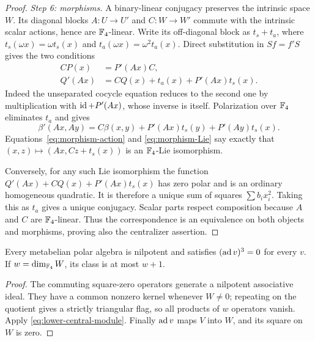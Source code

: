 \begin{proof}
\emph{Step 6: morphisms.}
A binary-linear conjugacy preserves the intrinsic space \(W\).
Its diagonal blocks \(A:U\to U'\) and \(C:W\to W'\) commute with
the intrinsic scalar actions, hence are \(\mathbb F_4\)-linear.
Write its off-diagonal block as \(t_s+t_a\), where
\(t_s(\omega x)=\omega t_s(x)\) and
\(t_a(\omega x)=\omega^2t_a(x)\).
Direct substitution in \(Sf=f'S\) gives the two conditions
\begin{align}
 CP(x)&=P'(Ax)C,\label{eq:morphism-action}\\
 Q'(Ax)&=CQ(x)+t_a(x)+P'(Ax)t_s(x).
 \label{eq:morphism-cocycle}
\end{align}
Indeed the unseparated cocycle equation reduces to the second one by
multiplication with \(\operatorname{id}+P'(Ax)\), whose inverse is itself.
Polarization over \(\mathbb F_4\) eliminates \(t_a\) and gives
\begin{equation}\label{eq:morphism-Lie}
 \beta'(Ax,Ay)=C\beta(x,y)
              +P'(Ax)t_s(y)+P'(Ay)t_s(x).
\end{equation}
Equations~\eqref{eq:morphism-action} and \eqref{eq:morphism-Lie}
say exactly that \((x,z)\mapsto(Ax,Cz+t_s(x))\) is an
\(\mathbb F_4\)-Lie isomorphism.

Conversely, for any such Lie isomorphism the function
\(Q'(Ax)+CQ(x)+P'(Ax)t_s(x)\) has zero polar and is an ordinary
homogeneous quadratic. It is therefore a unique sum of squares
\(\sum b_ix_i^2\). Taking this as \(t_a\) gives a unique conjugacy.
Scalar parts respect composition because \(A\) and \(C\) are
\(\mathbb F_4\)-linear. Thus the correspondence is an equivalence on both
objects and morphisms, proving also the centralizer assertion.
\end{proof}

\begin{corollary}\label{cor:metabelian-nilpotent}
Every metabelian polar algebra is nilpotent and satisfies
\((\operatorname{ad} v)^3=0\) for every \(v\). If \(w=\dim_{\mathbb F_4}W\), its class is
at most \(w+1\).
\end{corollary}
\begin{proof}
The commuting square-zero operators generate a nilpotent associative ideal.
They have a common nonzero kernel whenever \(W\ne0\); repeating on the
quotient gives a strictly triangular flag, so all products of \(w\)
operators vanish. Apply \eqref{eq:lower-central-module}.
Finally \(\operatorname{ad} v\) maps \(V\) into \(W\), and its square on \(W\) is zero.
\end{proof}

